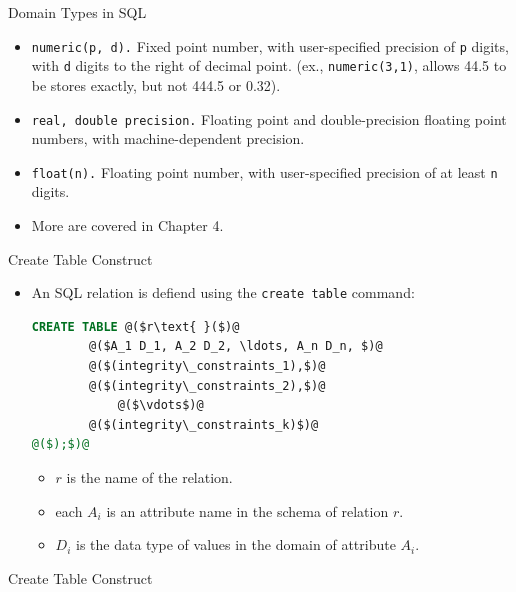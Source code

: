 \documentclass{beamer}
\begin{document}
\begin{frame}{Domain Types in SQL}
    \begin{itemize}
        \item \texttt{numeric(p, d).} Fixed point number, with user-specified precision of \texttt{p} digits, with \texttt{d} digits to the right of decimal point. (ex., \texttt{numeric(3,1)}, allows 44.5 to be stores exactly, but not 444.5 or 0.32).
        \item \texttt{real, double precision.} Floating point and double-precision floating point numbers, with machine-dependent precision.
        \item \texttt{float(n).} Floating point number, with user-specified precision of at least \texttt{n} digits.
        \item More are covered in Chapter 4.
    \end{itemize}
\end{frame}

\begin{frame}[fragile]{Create Table Construct}
    \begin{itemize}
        \item An SQL relation is defiend using the \texttt{create table} command:
        \begin{lstlisting}[language=SQL]
CREATE TABLE @($r\text{ }($)@
        @($A_1 D_1, A_2 D_2, \ldots, A_n D_n, $)@
        @($(integrity\_constraints_1),$)@
        @($(integrity\_constraints_2),$)@
            @($\vdots$)@
        @($(integrity\_constraints_k)$)@
@($);$)@
        \end{lstlisting}
        \begin{itemize}
            \item $r$ is the name of the relation.
            \item each $A_i$ is an attribute name in the schema of relation $r$.
            \item $D_i$ is the data type of values in the domain of attribute $A_i$.
        \end{itemize}
    \end{itemize}
\end{frame}

\begin{frame}[fragile]{Create Table Construct}
\end{frame}
\end{document}
